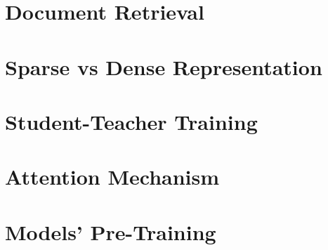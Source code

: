 \section{Document Retrieval}
\section{Sparse vs Dense Representation}
\section{Student-Teacher Training}
\section{Attention Mechanism}
\section{Models' Pre-Training}